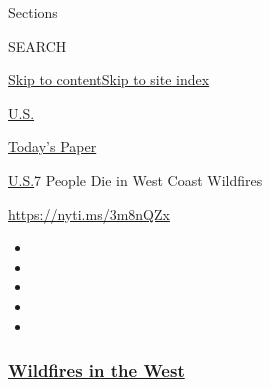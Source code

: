 Sections

SEARCH

\protect\hyperlink{site-content}{Skip to
content}\protect\hyperlink{site-index}{Skip to site index}

\href{https://www.nytimes3xbfgragh.onion/section/us}{U.S.}

\href{https://myaccount.nytimes3xbfgragh.onion/auth/login?response_type=cookie\&client_id=vi}{}

\href{https://www.nytimes3xbfgragh.onion/section/todayspaper}{Today's
Paper}

\href{/section/us}{U.S.}\textbar{}7 People Die in West Coast Wildfires

\url{https://nyti.ms/3m8nQZx}

\begin{itemize}
\item
\item
\item
\item
\item
\end{itemize}

\hypertarget{wildfires-in-the-west}{%
\subsubsection{\texorpdfstring{\href{https://www.nytimes3xbfgragh.onion/spotlight/california-wildfires?name=styln-california-wildfires\&region=TOP_BANNER\&block=storyline_menu_recirc\&action=click\&pgtype=Article\&impression_id=805822c0-f52b-11ea-bf06-e35e969503ac\&variant=undefined}{Wildfires
in the West}}{Wildfires in the West}}\label{wildfires-in-the-west}}

